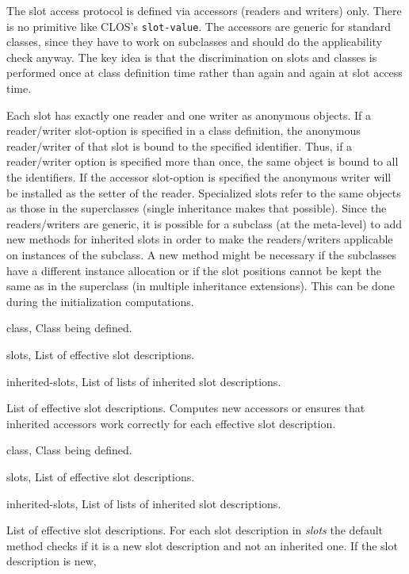 %
\begin{optDefinition}
The slot access protocol is defined via accessors (readers and writers)
only. There is no primitive like CLOS's {\tt slot-value}. The accessors are
generic for standard classes, since they have to work on subclasses and should
do the applicability check anyway.  The key idea is that the discrimination on
slots and classes is performed once at class definition time rather
than again and again at slot access time.

Each slot has exactly one reader and one writer as anonymous
objects. If a reader/writer slot-option is specified in a class definition, the
anonymous reader/writer of that slot is bound to the specified
identifier. Thus, if a reader/writer option is specified more than once, the
same object is bound to all the identifiers. If the accessor slot-option is
specified the anonymous writer will be installed as the setter of the reader.
Specialized slots refer to the same objects as those in the
superclasses (single inheritance makes that possible).  Since the
readers/writers are generic, it is possible for a subclass (at the meta-level)
to add new methods for inherited slots in order to make the
readers/writers applicable on instances of the subclass. A new method might be
necessary if the subclasses have a different instance allocation or if the slot
positions cannot be kept the same as in the superclass (in multiple inheritance
extensions).  This can be done during the initialization computations.

%
\begin{genericargs}
    \item[class, \classref{class}] Class being defined.
    \item[slots, \classref{list}] List of effective slot
    descriptions.
    \item[inherited-slots, \classref{list}] List of lists of
    inherited slot descriptions.
\end{genericargs}
%
\result%
List of effective slot descriptions.
%
\remarks%
Computes new accessors or ensures that inherited accessors work
correctly for each effective slot description.

%
\begin{specargs}
    \item[class, \classref{class}] Class being defined.
    \item[slots, \classref{list}] List of effective slot
    descriptions.
    \item[inherited-slots, \classref{list}] List of lists of
    inherited slot descriptions.
\end{specargs}
%
\result%
List of effective slot descriptions.
%
\remarks%
For each slot description in {\em slots\/} the default method
checks if it is a new slot description and not an
inherited one. If the slot description is new,
\begin{enumerate}


\end{enumerate}
\end{optDefinition}

